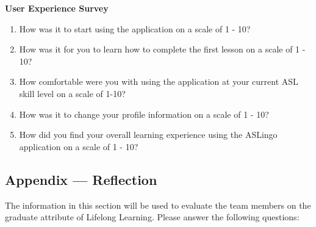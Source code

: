 \documentclass[12pt, titlepage]{article}
\begin{document}
\textbf{User Experience Survey}\label{appen}

\begin{enumerate}

\item How was it to start using the application on a scale of 1 - 10? \newline [ 1 = very hard to start, 10 = very easy to start]
\item How was it for you to learn how to complete the first lesson on a scale of 1 - 10? \newline [ 1 = very hard to learn, 10 = very easy to learn]
\item How comfortable were you with using the application at your current ASL skill level on a scale of 1-10? \newline [ 1 = very uncomfortable to use, 10 = very comfortable to use]
\item How was it to change your profile information on a scale of 1 - 10? \newline [ 1 = very hard to change, 10 = very easy to change]
\item How did you find your overall learning experience using the ASLingo application on a scale of 1 - 10? \newline [ 1 = very bad experience, 10 = very good experience]

\end{enumerate}

\subsection{Appendix --- Reflection}


The information in this section will be used to evaluate the team members on the
graduate attribute of Lifelong Learning.  Please answer the following questions:
\end{document}
